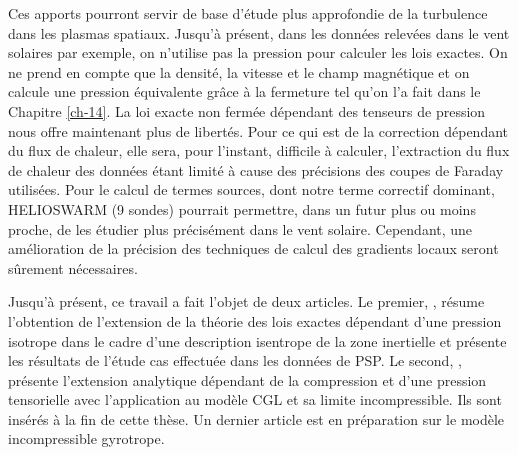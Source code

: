 Ces apports pourront servir de base d'étude plus approfondie de la turbulence dans les plasmas spatiaux. Jusqu'à présent, dans les données relevées dans le vent solaires par exemple, on n'utilise pas la pression pour calculer les lois exactes. On ne prend en compte que la densité, la vitesse et le champ magnétique et on calcule une pression équivalente grâce à la fermeture tel qu'on l'a fait dans le Chapitre \ref{ch-14}. La loi exacte non fermée dépendant des tenseurs de pression nous offre maintenant plus de libertés. Pour ce qui est de la correction dépendant du flux de chaleur, elle sera, pour l'instant, difficile à calculer, l'extraction du flux de chaleur des données étant limité à cause des précisions des coupes de Faraday utilisées. Pour le calcul de termes sources, dont notre terme correctif dominant, HELIOSWARM (9 sondes) pourrait permettre, dans un futur plus ou moins proche, de les étudier plus précisément dans le vent solaire. Cependant, une amélioration de la précision des techniques de calcul des gradients locaux seront sûrement nécessaires. 

Jusqu'à présent, ce travail a fait l'objet de deux articles. Le premier, \cite{simon_general_2021}, résume l'obtention de l'extension de la théorie des lois exactes dépendant d'une pression isotrope dans le cadre d'une description isentrope de la zone inertielle et présente les résultats de l'étude cas effectuée dans les données de \ac{PSP}. Le second, \cite{simon_exact_2022}, présente l'extension analytique dépendant de la compression et d'une pression tensorielle avec l'application au modèle \ac{CGL} et sa limite incompressible. Ils sont insérés à la fin de cette thèse. Un dernier article est en préparation sur le modèle incompressible gyrotrope.    

